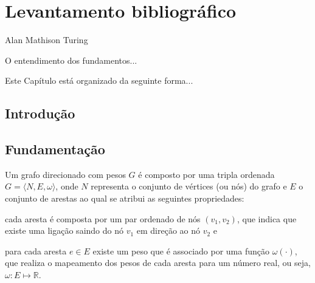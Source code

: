 
\chapter{Levantamento bibliográfico}
\label{cap:2:fundamentacao}

{Alan Mathison Turing}

O entendimento dos fundamentos...

Este Capítulo está organizado da seguinte forma...

\section{Introdução}
\label{sec:2:introducao}

\citep{brassard1996fundamentals}

\section{Fundamentação}
\label{sec:2:fundamentacao}

\begin{definicao}\label{def:grafo}
%
%
\citep{cormen2009algorithms}
Um grafo direcionado com pesos $G$ é composto por uma tripla ordenada
$G=\langle N, E, \omega \rangle$, onde $N$ representa o conjunto de vértices
(ou nós) do grafo e $E$ o conjunto de arestas ao qual se atribui as seguintes
propriedades:
\begin{inparaenum}[(i)]
\item cada aresta é composta por um par ordenado de nós $(v_1,v_2)$, que indica
    que existe uma ligação saindo do nó $v_1$ em direção ao nó $v_2$ e
\item para cada aresta $e \in E$ existe um peso que é associado por uma função
    $\omega(\cdot)$, que realiza o mapeamento dos pesos de cada aresta para um
    número real, ou seja, $\omega \colon E\mapsto\mathbb{R}$.
\end{inparaenum}
\end{definicao}

